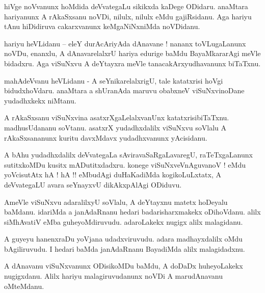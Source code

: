 \documentclass{article}
\begin{document}
\begin{mn}%
hiVge noVvanunx hoMdida deVvategaLu sikikxda kaDege ODidaru. anaMtara hariyanunx A rAkaSxsanu 
noVDi, nilulx, nilulx eMdu gajiRsidanu. Aga hariyu tAnu hiDidiruva cakarxvanunx keMgaNiNxniMda 
noVDidanu.
\end{mn}

\begin{mn}%
hariyu heVLidanu -- eleY durAcAriyAda dAnavane ! nananx toVLugaLanunx noVDu, enanxlu, A 
dAnavarelalxrU hariya edurige baMdu BayaMkararAgi meVle bidadxru. Aga viSuNxvu A deYtayxra meVle 
tanacakArxyudhavanunx biTaTxnu.
\end{mn}

\begin{mn}%
mahAdeVvanu heVLidanu - A seYnikarelalxrigU, tale katatxrisi hoVgi bidudxhoVdaru. anaMtara a 
shUranAda maruvu obabxneV viSuNxvinoDane yudadhxkekx niMtanu.
\end{mn}

\begin{mn}%
A rAkaSxsanu viSuNxvina asatxrXgaLelalxvanUnx katatxrisibiTaTxnu. madhusUdananu soVtanu. asatxrX 
yudadhxdalilx viSuNxvu soVlalu A rAkaSxsananunx kuritu davxMdavx yudadhxvanunx yAcisidanu.
\end{mn}

\begin{mn}%
A bAhu yudadhxdalilx deVvategaLa sAviravaSaRgaLavaregU, raTeTxgaLanunx sutitxkoMDu kusitx 
mADutitxdadxru. konege viSuNxveVnAguvanoV ! eMdu yoVcisutAtx hA ! hA !! eMbudAgi duHaKadiMda 
kogikoLuLxtatx, A deVvategaLU avara seYnayxvU dikAkxpAlAgi ODiduvu.
\end{mn}

\begin{mn}%
AmeVle viSuNxvu adaralilxyU soVlalu, A deYtayxnu matetx hoDeyalu  baMdanu. idariMda a janAdaRnanu  
hedari badarisharxmakekx oDihoVdanu. alilx siMhAvatiV eMba guheyoMdiruvudu. adaroLakekx nugigx 
alilx malagidanu.
\end{mn}

\begin{mn}%
A guyeyu hanenxraDu yoVjana udadxviruvudu. adara madhayxdalilx oMdu bAgiliruvudu. I hedari baMda 
janAdaRnanu BayadiMda alilx malagidadxnu.
\end{mn}

\begin{mn}%
A dAnavanu viSuNxvanunx ODisikoMDu baMdu, A doDaDx huheyoLakekx nugigxdanu. Alilx hariyu 
malagiruvudanunx noVDi A marudAnavanu oMteMdanu.
\end{mn}
\end{document}
